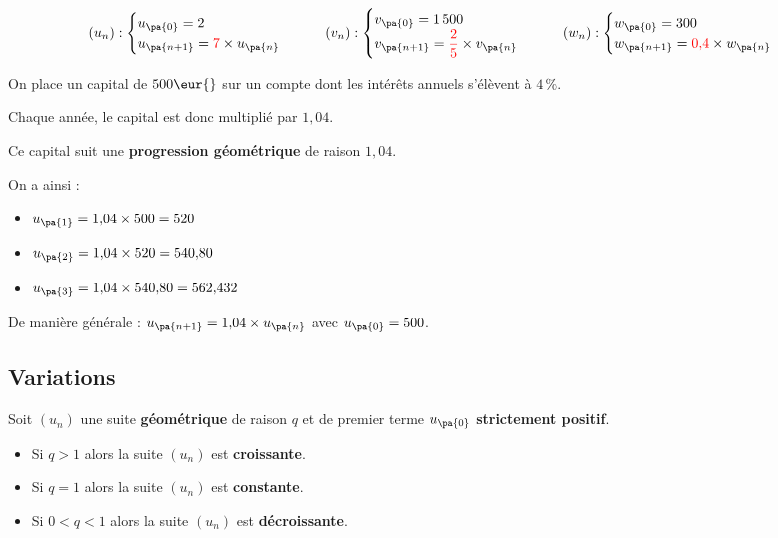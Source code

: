 \begin{ex}
	\[
		(u_n) : \begin{cases} u_{\pa{0}} = 2 \\ u_{\pa{n+1}} = {\color{red}{7}}\times u_{\pa{n}} \end{cases}
		\qquad
		(v_n) : \begin{cases} v_{\pa{0}} = 1\,500 \\ v_{\pa{n+1}} = {\color{red}{\dfrac{2}{5}}}\times v_{\pa{n}} \end{cases}
		\qquad
		(w_n) : \begin{cases} w_{\pa{0}} = 300 \\ w_{\pa{n+1}} = {\color{red}{0{,}4}}\times w_{\pa{n}} \end{cases}
	\]
\end{ex}

\begin{ex}
	On place un capital de $500\eur{}$ sur un compte dont les intérêts annuels s'élèvent à $4\,\%$.

	Chaque année, le capital est donc multiplié par $1{,}04$.

	Ce capital suit une \textbf{progression géométrique} de raison $1{,}04$.

	On a ainsi :

	\begin{itemize}
		\item $u_{\pa{1}} = 1{,}04 \times 500 = 520$
		\item $u_{\pa{2}} = 1{,}04 \times 520 = 540{,}80$
		\item $u_{\pa{3}} = 1{,}04 \times 540{,}80 = 562{,}432$
	\end{itemize}

	De manière générale : $u_{\pa{n + 1}} = 1{,}04 \times u_{\pa{n}}$ avec $u_{\pa{0}} = 500$.
\end{ex}

\subsection{Variations}

\begin{propriete}
	Soit $(u_{n})$ une suite \textbf{géométrique} de raison $q$ et de premier terme $u_{\pa{0}}$ \textbf{strictement positif}.

	\begin{itemize}
		\item Si $q>1$ alors la suite $(u_{n})$ est \textbf{croissante}.
		\item Si $q=1$ alors la suite $(u_{n})$ est \textbf{constante}.
		\item Si $0 < q < 1$ alors la suite $(u_{n})$ est \textbf{décroissante}.
	\end{itemize}
\end{propriete}

